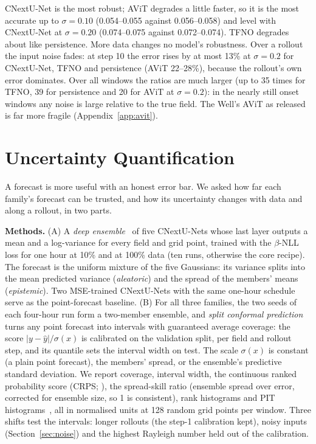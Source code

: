 \documentclass[11pt]{article}
\begin{document}
CNextU-Net is the most robust; AViT degrades a little faster, so it is the most accurate up to $\sigma=0.10$ (0.054--0.055
against 0.056--0.058) and level with CNextU-Net at $\sigma=0.20$ (0.074--0.075 against 0.072--0.074). TFNO degrades
about like persistence. More data changes no model's robustness. Over a rollout the input noise fades: at step 10 the
error rises by at most 13\% at $\sigma=0.2$ for CNextU-Net, TFNO and persistence (AViT 22--28\%), because the
rollout's own error dominates. Over all windows the ratios are much larger (up to 35 times for TFNO, 39 for
persistence and 20 for AViT at $\sigma=0.2$): in the nearly still onset windows any noise is large relative to the
true field. The Well's AViT as released is far more fragile (Appendix~\ref{app:avit}).

\section{Uncertainty Quantification}
\label{sec:uq}

A forecast is more useful with an honest error bar. We asked how far each family's forecast can be trusted, and how
its uncertainty changes with data and along a rollout, in two parts.

\textbf{Methods.} (A) A \emph{deep ensemble}~\cite{lakshminarayanan2017ensembles} of five CNextU-Nets whose last layer
outputs a mean and a log-variance for every field and grid point, trained with the $\beta$-NLL loss
\citep[$\beta=1$;][]{seitzer2022pitfalls} for one hour at 10\% and at 100\% data (ten runs, otherwise the core recipe).
The forecast is the uniform mixture of the five Gaussians: its variance splits into the mean predicted variance
(\emph{aleatoric}) and the spread of the members' means (\emph{epistemic}). Two MSE-trained CNextU-Nets with the same
one-hour schedule serve as the point-forecast baseline. (B) For all three families, the two seeds of each four-hour
run form a two-member ensemble, and \emph{split conformal prediction}~\cite{angelopoulos2021gentle} turns any point
forecast into intervals with guaranteed average coverage: the score $|y-\hat y|/\sigma(x)$ is calibrated on the
validation split, per field and rollout step, and its quantile sets the interval width on test. The scale $\sigma(x)$
is constant (a plain point forecast), the members' spread, or the ensemble's predictive standard deviation. We report
coverage, interval width, the continuous ranked probability score (CRPS; \citealp{gneiting2007scoring}), the spread-skill
ratio (ensemble spread over error, corrected for ensemble size, so 1 is consistent), rank histograms and PIT
histograms~\cite{hamill2001rank}, all in normalised units at 128 random grid points per window. Three shifts test the
intervals: longer rollouts (the step-1 calibration kept), noisy inputs (Section~\ref{sec:noise}) and the highest
Rayleigh number held out of the calibration.
\end{document}
